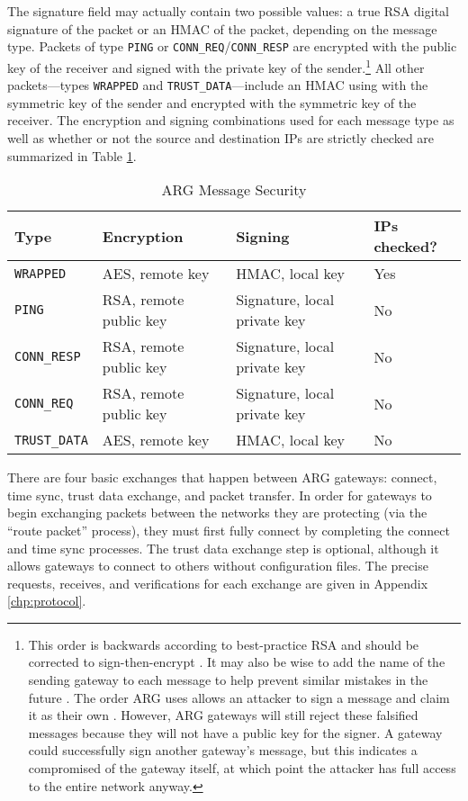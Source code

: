 \par The signature field may actually contain two possible values: a true \ac{RSA} digital signature of the packet or an \ac{HMAC} of the packet, depending on the message type. Packets of type \texttt{PING} or \texttt{CONN\_REQ}/\texttt{CONN\_RESP} are encrypted with the public key of the receiver and signed with the private key of the sender.\footnote{This order is backwards according to best-practice \ac{RSA} and should be corrected to sign-then-encrypt \cite{RobustPrinciplesPK}. It may also be wise to add the name of the sending gateway to each message to help prevent similar mistakes in the future \cite{EngPricCrypto}. The order \ac{ARG} uses allows an attacker to sign a message and claim it as their own \cite{rfc2633}. However, \ac{ARG} gateways will still reject these falsified messages because they will not have a public key for the signer. A gateway could successfully sign another gateway's message, but this indicates a compromised of the gateway itself, at which point the attacker has full access to the entire network anyway.} All other packets---types \texttt{WRAPPED} and \texttt{TRUST\_DATA}---include an \ac{HMAC} using with the symmetric key of the sender and encrypted with the symmetric key of the receiver. The encryption and signing combinations used for each message type as well as whether or not the source and destination \ac{IP}s are strictly checked are summarized in Table \ref{tbl:arg_protocol_security}.

\begin{table}
\caption{\ac{ARG} Message Security}
\label{tbl:arg_protocol_security}
\centering
\begin{tabular}{l|l|l|l}
\textbf{Type} & \textbf{Encryption} & \textbf{Signing} & \textbf{\acp{IP} checked?}\\
\hline
\texttt{WRAPPED} & AES, remote key & HMAC, local key & Yes\\
\texttt{PING} & RSA, remote public key & Signature, local private key & No\\
\texttt{CONN\_RESP} & RSA, remote public key & Signature, local private key & No\\
\texttt{CONN\_REQ} & RSA, remote public key & Signature, local private key & No\\
\texttt{TRUST\_DATA} & AES, remote key & HMAC, local key & No\\
\end{tabular}
\end{table}

\par There are four basic exchanges that happen between \ac{ARG} gateways: connect, time sync, trust data exchange, and packet transfer. In order for gateways to begin exchanging packets between the networks they are protecting (via the ``route packet'' process), they must first fully connect by completing the connect and time sync processes. The trust data exchange step is optional, although it allows gateways to connect to others without configuration files. The precise requests, receives, and verifications for each exchange are given in Appendix \ref{chp:protocol}.

